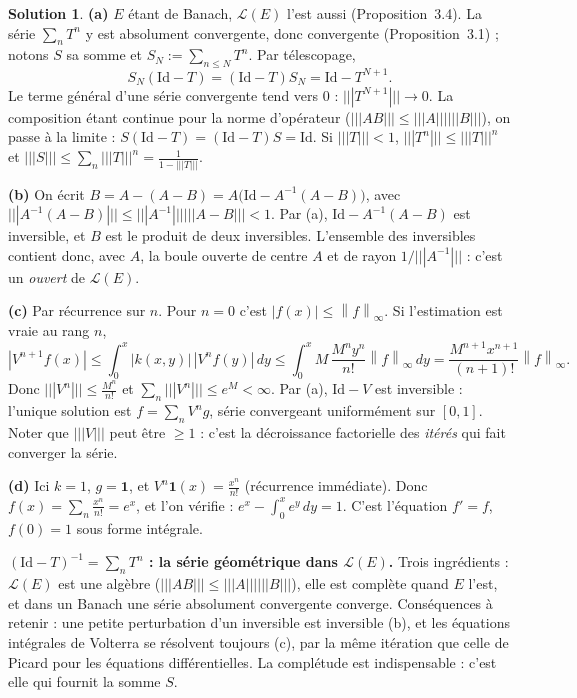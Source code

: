 \documentclass[11pt,a4paper]{article}
\newcommand{\norm}[1]{\left\|#1\right\|}
\newcommand{\opnorm}[1]{|\!|\!|#1|\!|\!|}
\newcommand{\Lc}{\mathcal{L}}
\theoremstyle{definition}
\newtheorem*{solution}{Solution}
\begin{document}
\begin{solution}
\noindent\textbf{(a)} $E$ étant de Banach, $\Lc(E)$ l'est aussi (Proposition~3.4). La série $\sum_nT^n$ y est absolument convergente, donc convergente (Proposition~3.1) ; notons $S$ sa somme et $S_N:=\sum_{n\le N}T^n$. Par télescopage,
\[
S_N(\mathrm{Id}-T)=(\mathrm{Id}-T)S_N=\mathrm{Id}-T^{N+1} .
\]
Le terme général d'une série convergente tend vers $0$ : $\opnorm{T^{N+1}}\to0$. La composition étant continue pour la norme d'opérateur ($\opnorm{AB}\le\opnorm A\opnorm B$), on passe à la limite : $S(\mathrm{Id}-T)=(\mathrm{Id}-T)S=\mathrm{Id}$. Si $\opnorm T<1$, $\opnorm{T^n}\le\opnorm T^n$ et $\opnorm S\le\sum_n\opnorm T^n=\frac1{1-\opnorm T}$.

\medskip
\noindent\textbf{(b)} On écrit $B=A-(A-B)=A\big(\mathrm{Id}-A^{-1}(A-B)\big)$, avec $\opnorm{A^{-1}(A-B)}\le\opnorm{A^{-1}}\opnorm{A-B}<1$. Par (a), $\mathrm{Id}-A^{-1}(A-B)$ est inversible, et $B$ est le produit de deux inversibles. L'ensemble des inversibles contient donc, avec $A$, la boule ouverte de centre $A$ et de rayon $1/\opnorm{A^{-1}}$ : c'est un \emph{ouvert} de $\Lc(E)$.

\medskip
\noindent\textbf{(c)} Par récurrence sur $n$. Pour $n=0$ c'est $|f(x)|\le\norm f_\infty$. Si l'estimation est vraie au rang $n$,
\[
|V^{n+1}f(x)|\le\int_0^x|k(x,y)|\,|V^nf(y)|\,dy\le\int_0^xM\,\frac{M^ny^n}{n!}\norm f_\infty\,dy=\frac{M^{n+1}x^{n+1}}{(n+1)!}\norm f_\infty .
\]
Donc $\opnorm{V^n}\le\frac{M^n}{n!}$ et $\sum_n\opnorm{V^n}\le e^M<\infty$. Par (a), $\mathrm{Id}-V$ est inversible : l'unique solution est $f=\sum_nV^ng$, série convergeant uniformément sur $[0,1]$. Noter que $\opnorm V$ peut être $\ge1$ : c'est la décroissance factorielle des \emph{itérés} qui fait converger la série.

\medskip
\noindent\textbf{(d)} Ici $k=1$, $g=\mathbf 1$, et $V^n\mathbf 1(x)=\frac{x^n}{n!}$ (récurrence immédiate). Donc $f(x)=\sum_n\frac{x^n}{n!}=e^x$, et l'on vérifie : $e^x-\int_0^xe^y\,dy=1$. C'est l'équation $f'=f$, $f(0)=1$ sous forme intégrale.
\end{solution}

\begin{pointcle}
\textbf{$(\mathrm{Id}-T)^{-1}=\sum_nT^n$ : la série géométrique dans $\Lc(E)$.} Trois ingrédients : $\Lc(E)$ est une algèbre ($\opnorm{AB}\le\opnorm A\opnorm B$), elle est complète quand $E$ l'est, et dans un Banach une série absolument convergente converge. Conséquences à retenir : une petite perturbation d'un inversible est inversible (b), et les équations intégrales de Volterra se résolvent toujours (c), par la même itération que celle de Picard pour les équations différentielles. La complétude est indispensable : c'est elle qui fournit la somme $S$.
\end{pointcle}
\end{document}
